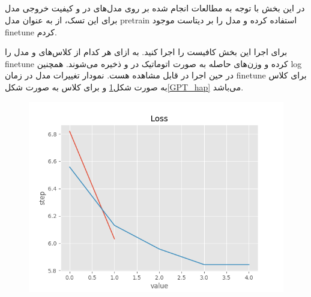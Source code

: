 \documentclass[10pt]{article}
\begin{document}
\subsection{}
در این بخش با توجه به مطالعات انجام شده بر روی مدل‌های
 در 
و کیفیت خروجی مدل برای این تسک، از
به عنوان مدل pretrain استفاده کرده و مدل را بر دیتاست موجود finetune کردم.

برای اجرا این بخش کافیست
را اجرا کنید.
به ازای هر کدام از کلاس‌های 
و
مدل را finetune کرده و وزن‌های حاصله به صورت اتوماتیک در
و
ذخیره می‌شوند. همچنین log در حین اجرا در 
قابل مشاهده هست. نمودار تغییرات  
مدل در زمان finetune برای کلاس
 به صورت شکل\ref{GPT_dep}
 و برای کلاس
به صورت شکل\ref{GPT_hap}
می‌باشد.
	\begin{figure}[H]
		\centering\includegraphics[width=\linewidth]{../reports/loss_history_GPT2_depression.png}
		\caption{ 
			}
		\label{GPT_dep}
	\end{figure}
	
\end{document}

